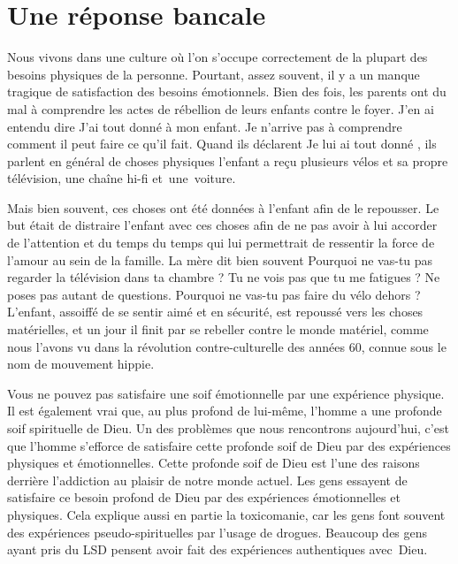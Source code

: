 \section{Une r\'eponse bancale}

Nous vivons dans une culture où l'on s'occupe correctement de la plupart
 des besoins physiques de la personne. Pourtant, assez souvent,
 il y a un manque tragique de satisfaction des besoins émotionnels.
 Bien des fois, les parents ont du mal à comprendre les actes de rébellion
 de leurs enfants contre le foyer. J'en ai entendu dire\frcolon{}
 \Og J'ai tout donné à mon enfant. Je n'arrive pas à comprendre
 comment il peut faire ce qu'il fait. \Fg{}
 Quand ils déclarent\frcolon{} \Og Je lui ai tout donné \Fg{}, ils parlent en général
 de choses physiques\frcolon{} l'enfant a reçu plusieurs vélos
 et sa propre télévision, une chaîne hi-fi et~une~voiture.
 \nowidow[6]

Mais bien souvent, ces choses ont été données à l'enfant afin de le repousser.
 Le but était de distraire l'enfant avec ces choses afin de ne pas avoir
 à lui accorder de l'attention et du temps
 \ocadr du temps qui lui permettrait de ressentir la force
 de l'amour au sein de la famille. La mère dit bien souvent\frcolon{}
 \Og Pourquoi ne vas-tu pas regarder la télévision dans ta chambre ?
 Tu ne vois pas que tu me fatigues ? Ne poses pas autant de questions.
 Pourquoi ne vas-tu pas faire du vélo dehors ? \Fg{}
 L'enfant, assoiffé de se sentir aimé et en sécurité,
 est repoussé vers les choses matérielles, et un jour il finit
 par se rebeller contre le monde matériel, comme nous l'avons vu
 dans la révolution contre-culturelle des années 60, connue sous le nom de mouvement hippie.


Vous ne pouvez pas satisfaire une soif émotionnelle par une
 expérience physique. Il est également vrai que, au plus profond de lui-même,
 l'homme a une profonde soif spirituelle de Dieu.
 Un des problèmes que nous rencontrons aujourd'hui, c'est que l'homme
 s'efforce de satisfaire cette profonde soif de Dieu
 par des expériences physiques et émotionnelles.
 Cette profonde soif de Dieu est l'une des raisons derrière l'addiction
 au plaisir de notre monde actuel. Les gens essayent de satisfaire
 ce besoin profond de Dieu par des expériences émotionnelles et physiques.
 Cela explique aussi en partie la toxicomanie,
 car les gens font souvent des expériences pseudo-spirituelles
 par l'usage de drogues. Beaucoup des gens ayant pris du LSD
 pensent avoir fait des expériences authentiques avec~Dieu.


